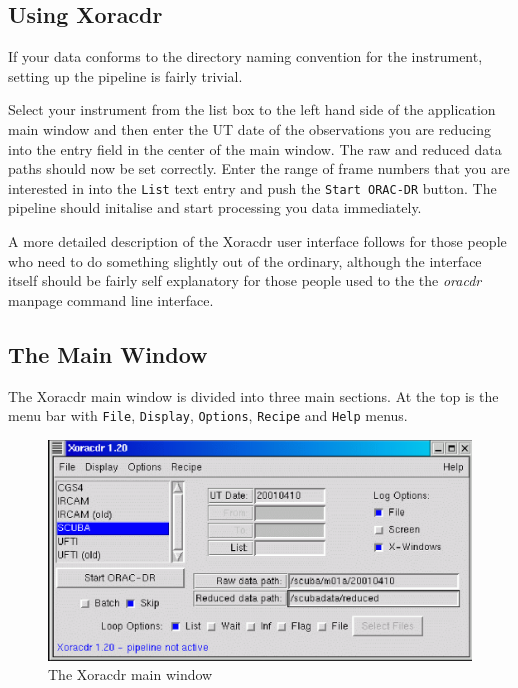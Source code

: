\documentclass[twoside,11pt]{article}
\renewcommand{\_}{\texttt{\symbol{95}}}
\begin{document}
\subsection*{Using Xoracdr\label{Xoracdr_USING_XORACDR}}

If your data conforms to the directory naming convention for the
instrument, setting up the pipeline is fairly trivial.



Select your instrument from the list box to the left hand side of the
application main window and then enter the UT date of the observations
you are reducing into the entry field in the center of the main
window. The raw and reduced data paths should now be set
correctly. Enter the range of frame numbers that you are interested in
into the \texttt{List} text entry and push the \texttt{Start ORAC-DR} button. The
pipeline should initalise and start processing you data immediately.



A more detailed description of the Xoracdr user interface follows for
those people who need to do something slightly out of the ordinary,
although the interface itself should be fairly self explanatory for
those people used to the the \emph{oracdr} manpage command line interface.

\subsection*{The Main Window\label{Xoracdr_THE_MAIN_WINDOW}}

The Xoracdr main window is divided into three main sections. At the
top is the menu bar with \texttt{File}, \texttt{Display}, \texttt{Options}, \texttt{Recipe}
and \texttt{Help} menus.

\begin{figure}
\begin{center}
\includegraphics[width=5.0in]{sun230_xoracdr.eps}
\caption{The Xoracdr main window}
\end{center}
\end{figure}
\end{document}
